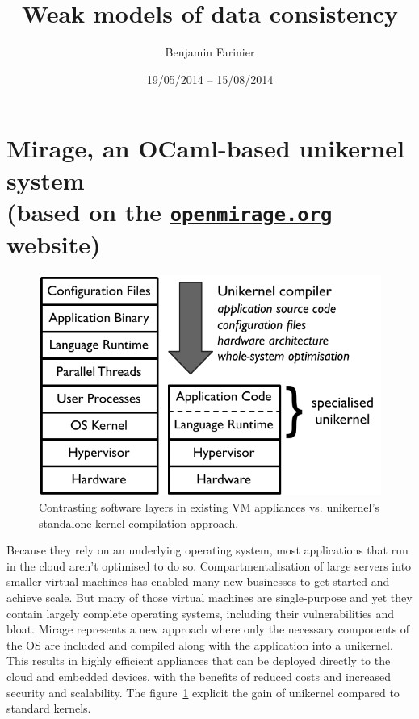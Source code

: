 \documentclass{article}
\title{Weak models of data consistency}
\author{Benjamin Farinier}
\date{19/05/2014 -- 15/08/2014}
\renewcommand{\-}{\hyp}
\newcommand{\mirage}{Mirage\xspace}
\newcommand{\ocaml}{OCaml\xspace}
\begin{document}
\maketitle
\tableofcontents

\section[\mirage, an \ocaml-based unikernel system]{\mirage, an \ocaml-based unikernel system\\\normalsize\normalfont(based on the \href{http://openmirage.org}{\texttt{openmirage.org}} website)}


\begin{figure}[hbt]
\centering
\includegraphics[scale=0.8]{mirage-stack.pdf}
\caption{Contrasting software layers in existing VM appliances vs.
unikernel’s standalone kernel compilation approach.}
\label{miragestackgraph}
\end{figure}

Because they rely on an underlying operating system, most applications that run in the cloud aren't optimised to do so.
Compartmentalisation of large servers into smaller virtual machines has enabled many new businesses to get started and achieve scale.
But many of those virtual machines are single-purpose and yet they contain largely complete operating systems, including their vulnerabilities and bloat.
\mirage represents a new approach where only the necessary components of the OS are included and compiled along with the application into a unikernel.
This results in highly efficient appliances that can be deployed directly to the cloud and embedded devices, with the benefits of reduced costs and increased security and scalability. The figure~\ref{miragestackgraph} explicit the gain of unikernel compared to standard kernels.
\end{document}
